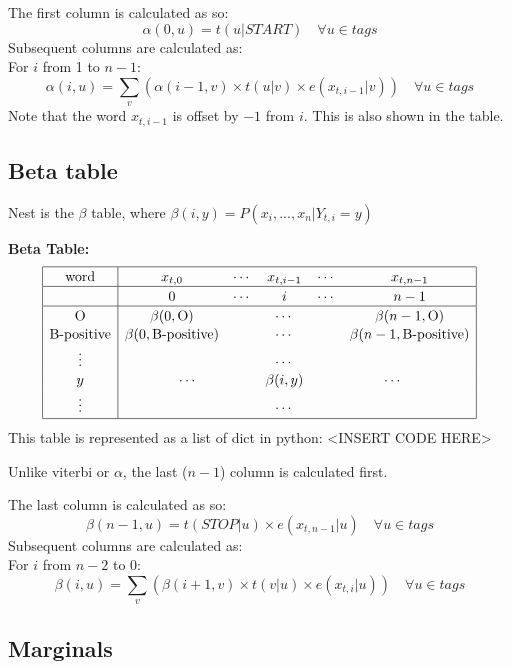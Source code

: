 \documentclass[12pt]{article}
\begin{document}
The first column is calculated as so:
\[ \alpha(0,u) = t(u|START) \quad \forall u \in {tags}\]
Subsequent columns are calculated as:\\
For \(i\) from 1 to \(n-1\):
\[ \alpha(i,u) = \sum_v \left( \alpha(i-1,v) \times t(u|v) \times e(x_{t,i-1}|v) \right) \quad \forall u \in {tags}\]
Note that the word \(x_{t,i-1}\) is offset by \(-1\) from \(i\). This is also shown in the table.

\subsection{Beta table}
Nest is the \(\beta\) table, where \(\beta(i,y) = P(x_i,...,x_n | Y_{t,i}=y) \)

\textbf{Beta Table:}
\[
\begin{array}{|c|ccccc|}
\hline \rule{0pt}{1em}
\mbox{word} & x_{t,0} & \cdots & x_{t,i-1} & \cdots & x_{t,n-1} \\
\hline \rule{0pt}{1em}
& 0 & \cdots & i & \cdots & n-1 \\
\hline \rule{0pt}{1em}
\mbox{O}          & \beta(0,\mbox{O}) & \multicolumn{3}{c}{\cdots} & \beta(n-1,\mbox{O}) \\[0.1em]
\mbox{B-positive} & \beta(0,\mbox{B-positive}) & \multicolumn{3}{c}{\cdots} & \beta(n-1,\mbox{B-positive}) \\[0.1em]
\vdots &          & \multicolumn{3}{c}{\cdots} &            \\[0.1em]
y      & \multicolumn{2}{c}{\cdots} & \beta(i,y) & \multicolumn{2}{c|}{\cdots} \\[0.1em]
\vdots &          & \multicolumn{3}{c}{\cdots} &            \\[0.1em]
\hline
\end{array}
\]
This table is represented as a list of dict in python:
<INSERT CODE HERE>

Unlike viterbi or \(\alpha\), the last (\(n-1\)) column is calculated first.

The last column is calculated as so:
\[ \beta(n-1,u) = t(STOP|u) \times e(x_{t,n-1}|u) \quad \forall u \in {tags}\]
Subsequent columns are calculated as:\\
For \(i\) from \(n-2\) to 0:
\[ \beta(i,u) = \sum_v \left( \beta(i+1,v) \times t(v|u) \times e(x_{t,i}|u) \right) \quad \forall u \in {tags} \]

\subsection{Marginals}
\end{document}
